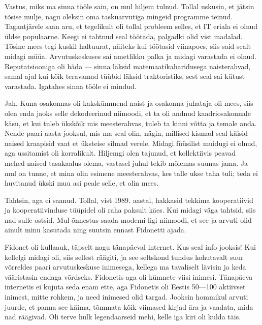 Vastus, miks ma sinna tööle sain, on mul hiljem 
tulnud. Tollal uskusin, et jätsin tõsise mulje, nagu oleksin oma 
taskuarvutiga mingeid programme teinud. Tagantjärele saan aru, et tegelikult oli tollal probleem selles, et IT eriala ei olnud üldse 
populaarne. Keegi ei tahtnud seal töötada, palgadki olid vist madalad. Tõsine 
mees tegi kuskil haltuurat, näiteks kui töötasid viinapoes, siis said 
sealt midagi müüa. Arvutuskeskuses sai ametlikku 
palka ja midagi varastada ei olnud. Reputatsiooniga oli häda --- sinna läksid 
matemaatikaharidusega naisterahvad, samal ajal kui kõik teravamad 
tüübid läksid traktoristiks, sest seal sai kütust varastada. 
Igatahes sinna tööle ei mindud. 


Jah. Kuna osakonnas oli kakskümmend naist ja osakonna 
juhataja oli mees, siis olen enda jaoks selle dekodeerinud niimoodi, 
et ta oli andnud kaadriosakonnale käsu, et kui tuleb ükskõik mis meesterahvas, 
tuleb ta kinni võtta ja temale anda. Nende paari aasta jooksul, mis 
ma seal olin, nägin, millised kismad seal käisid --- naised kraapisid vaat et
üksteise silmad verele. Midagi füüsilist muidugi ei olnud, aga ussitamist oli 
korralikult. Hiljemgi olen tajunud, et kollektiivis peavad 
mehed-naised tasakaalus olema, vastasel juhul tekib mõlemas suunas
jama. Ja mul on tunne, et mina olin esimene meesterahvas, kes talle ukse taha 
tuli; teda ei huvitanud ükski muu asi peale selle, et olin mees. 


Tahtsin, aga ei saanud. Tollal, vist 1989. aastal, hakkasid tekkima
kooperatiivid ja kooperatiivinduse tüüpidel oli raha 
paksult käes. Kui midagi väga tahtsid, siis nad sulle ostsid. Mul 
õnnestus saada modemi ligi niimoodi, et see ja arvuti olid ainult minu kasutada ning suutsin ennast Fidonetti ajada.

Fidonet oli 
kullaauk, täpselt nagu tänapäeval internet. Kus seal info jooksis! 
Kui kellelgi midagi oli, siis sellest räägiti, ja see seltskond tundus 
kohutavalt suur võrreldes paari arvutuskeskuse inimesega, kellega ma 
tavaliselt lävisin ja keda vääristasin endaga võrdseks. Fidonetis aga oli 
kümnete viisi inimesi. Tänapäeva internetis ei kujuta seda enam ette, aga Fidonetis oli Eestis 
50---100 aktiivset inimest, mitte rohkem, ja need inimesed 
olid targad. Jooksin hommikul arvuti juurde, et panna see käima, tõmmata 
kõik viimased kirjad ära ja vaadata, mida nad räägivad. Oli terve hulk 
legendaarseid mehi, kelle iga kiri oli kulda täis.

